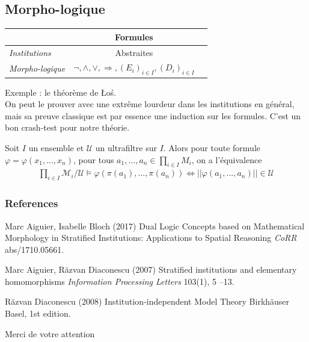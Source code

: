 \documentclass{beamer}
\newcommand{\gr}{\textbf}
\newcommand{\il}{\textit}
\begin{document}
\subsection{Morpho-logique}

\begin{frame}
\begin{center}
\begin{tabular}{|l|c|c|}
  \hline
   & \gr{Formules} \\
  \hline
  \il{Institutions} & Abstraites \\
  \hline
  \il{Morpho-logique} & $\neg,\wedge,\vee,\Rightarrow,(E_i)_{i\in I},(D_i)_{i\in I}$ \\
  \hline
\end{tabular}
\end{center}
\end{frame}

\begin{frame}
Exemple : le théorème de \L o\'s. \\
On peut le prouver avec une extrême lourdeur dans les institutions en général, mais sa preuve classique est par essence une induction sur les formules. C'est un bon crash-test pour notre théorie.
\begin{theorem}[\L o\'s]
Soit $I$ un ensemble et $\mathcal{U}$ un ultrafiltre sur $I$. Alors pour toute formule $\varphi = \varphi(x_1,...,x_n)$, pour tous $a_1,...,a_n \in \prod_{i\in I} M_i$, on a l'équivalence
\begin{align*}
 \prod_{i\in I} \mathcal{M}_i / \mathcal{U} \models \varphi(\pi(a_1),...,\pi(a_n)) \Longleftrightarrow ||\varphi(a_1,...,a_n)|| \in \mathcal{U}
\end{align*}
\end{theorem}
\end{frame}

\begin{frame}
\frametitle{References}
\footnotesize{
\begin{thebibliography}{99}
 Marc Aiguier, Isabelle Bloch (2017)
\newblock Dual Logic Concepts based on Mathematical Morphology in Stratified Institutions: Applications to Spatial Reasoning
\newblock \emph{CoRR} abs/1710.05661.

 Marc Aiguier, Răzvan Diaconescu (2007)
\newblock Stratified institutions and elementary homomorphisms
\newblock \emph{Information Processing Letters} 103(1), 5 --13.

 Răzvan Diaconescu (2008)
\newblock Institution-independent Model Theory
\newblock Birkhäuser Basel, 1st edition.

\end{thebibliography}
}
\end{frame}


\begin{frame}
\Huge{\centerline{Merci de votre attention}}
\end{frame}

\end{document}

